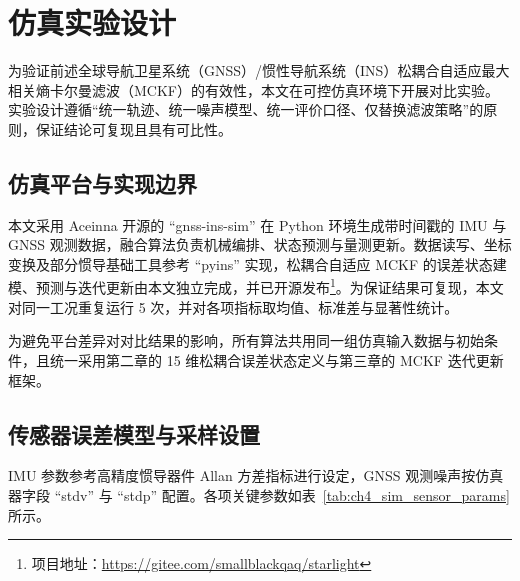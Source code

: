 \section{仿真实验设计}

为验证前述全球导航卫星系统（GNSS）/惯性导航系统（INS）松耦合自适应最大相关熵卡尔曼滤波（MCKF）的有效性，本文在可控仿真环境下开展对比实验。实验设计遵循“统一轨迹、统一噪声模型、统一评价口径、仅替换滤波策略”的原则，保证结论可复现且具有可比性。

\subsection{仿真平台与实现边界}

本文采用 Aceinna 开源的 ``gnss-ins-sim'' 在 Python 环境生成带时间戳的 IMU 与 GNSS 观测数据，融合算法负责机械编排、状态预测与量测更新。数据读写、坐标变换及部分惯导基础工具参考 ``pyins'' 实现，松耦合自适应 MCKF 的误差状态建模、预测与迭代更新由本文独立完成\cite{gnssinssim,pyins}，并已开源发布\footnote{项目地址：\url{https://gitee.com/smallblackqaq/starlight}}。为保证结果可复现，本文对同一工况重复运行 5 次，并对各项指标取均值、标准差与显著性统计。

为避免平台差异对对比结果的影响，所有算法共用同一组仿真输入数据与初始条件，且统一采用第二章的 15 维松耦合误差状态定义与第三章的 MCKF 迭代更新框架。

\subsection{传感器误差模型与采样设置}

IMU 参数参考高精度惯导器件 Allan 方差指标进行设定，GNSS 观测噪声按仿真器字段 ``stdv'' 与 ``stdp'' 配置\cite{wang2018using,han2010quantization}。各项关键参数如表~\ref{tab:ch4_sim_sensor_params} 所示。

